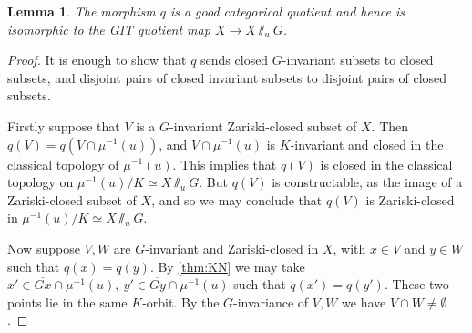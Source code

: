 \documentclass{amsart}
\newtheorem{theorem}{Theorem}[section]
\newtheorem{lemma}[theorem]{Lemma}
\theoremstyle{definition}
\newcommand{\PP}{\mathbb{P}}
\begin{document}
\begin{lemma}\label{lem:catquot}
The morphism \(q\) is a good categorical quotient and hence is isomorphic to the GIT quotient map \(X \to X\sslash_u G\).
\end{lemma}
%
%
%
\begin{proof}
It is enough to show that \(q\) sends closed \(G\)-invariant subsets to closed subsets, and disjoint pairs of closed invariant subsets to disjoint pairs of closed subsets.

Firstly suppose that \(V\) is a  \(G\)-invariant Zariski-closed subset of \(X\). Then \(q(V) = q(V \cap \mu^{-1}(u))\), and \(V \cap \mu^{-1}(u)\) is \(K\)-invariant and closed in the classical topology of \(\mu^{-1}(u)\). This implies that \(q(V)\) is closed in the classical topology on \(\mu^{-1}(u)/K \simeq X\sslash_u G\). But \(q(V)\) is constructable, as the image of a Zariski-closed subset of \(X\), and so we may conclude that \(q(V)\) is Zariski-closed in \(\mu^{-1}(u)/K \simeq X\sslash_u G\).

Now suppose \(V,W\) are \(G\)-invariant and Zariski-closed in \(X\), with \(x \in V\) and \(y \in W\) such that \(q(x) = q(y)\). By \ref{thm:KN} we may take \({x'} \in \overline{Gx} \cap \mu^{-1}(u), \ {y'} \in \overline{Gy} \cap \mu^{-1}(u)\) such that \(q({x'}) = q({y'})\). These two points lie in the same \(K\)-orbit. By the \(G\)-invariance of \(V,W\) we have \(V \cap W \neq \emptyset\).
\end{proof}
%
%
%
%
%
%

\end{document}
